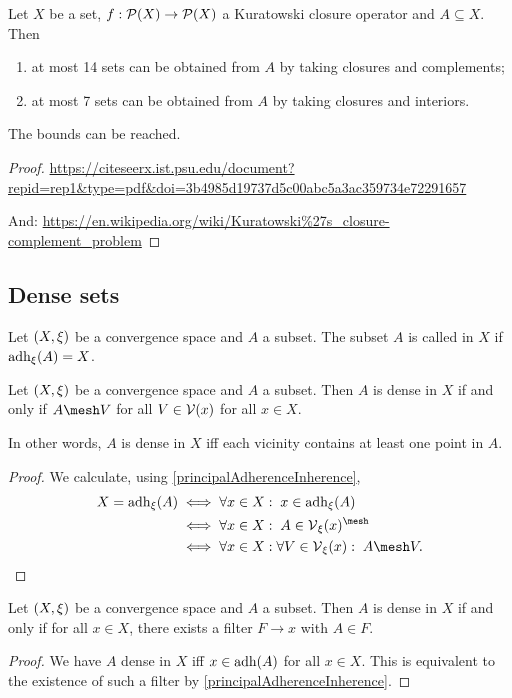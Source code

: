 \begin{theorem}
Let $X$ be a set, $f: \operatorname{\mathcal{P}}(X)\to\operatorname{\mathcal{P}}(X)$ a Kuratowski closure operator and $A\subseteq X$. Then
\begin{enumerate}
\item at most 14 sets can be obtained from $A$ by taking closures and complements;
\item at most 7 sets can be obtained from $A$ by taking closures and interiors.
\end{enumerate}
The bounds can be reached.
\end{theorem}
\begin{proof}
\url{https://citeseerx.ist.psu.edu/document?repid=rep1&type=pdf&doi=3b4985d19737d5c00abc5a3ac359734e72291657}

And: \url{https://en.wikipedia.org/wiki/Kuratowski%27s_closure-complement_problem}
\end{proof}

\subsection{Dense sets}
\begin{definition}
Let $\sSet{X, \xi}$ be a convergence space and $A$ a subset. The subset $A$ is called  in $X$ if $\operatorname{adh}_\xi(A) = X$.
\end{definition}

\begin{lemma} \label{denseIffMeshesWithAllVicinities}
Let $\sSet{X, \xi}$ be a convergence space and $A$ a subset. Then $A$ is dense in $X$ \textup{if and only if} $A\mesh V$ for all $V\in \operatorname{\mathcal{V}}(x)$ for all $x\in X$.
\end{lemma}
In other words, $A$ is dense in $X$ iff each vicinity contains at least one point in $A$.
\begin{proof}
We calculate, using \ref{principalAdherenceInherence},
\begin{align*}
X = \adh_\xi(A) &\iff \forall x\in X: \; x\in \adh_\xi(A) \\
&\iff \forall x\in X: \; A \in \vicinities_\xi(x)^\mesh \\
&\iff \forall x\in X: \forall V\in\vicinities_\xi(x): \; A \mesh V.
\end{align*}
\end{proof}

\begin{lemma} \label{convergentFiltersInDenseSet}
Let $\sSet{X, \xi}$ be a convergence space and $A$ a subset. Then $A$ is dense in $X$ \textup{if and only if} for all $x\in X$, there exists a filter $F\to x$ with $A\in F$.
\end{lemma}
\begin{proof}
We have $A$ dense in $X$ iff $x\in \operatorname{adh}(A)$ for all $x\in X$. This is equivalent to the existence of such a filter by \ref{principalAdherenceInherence}.
\end{proof}


